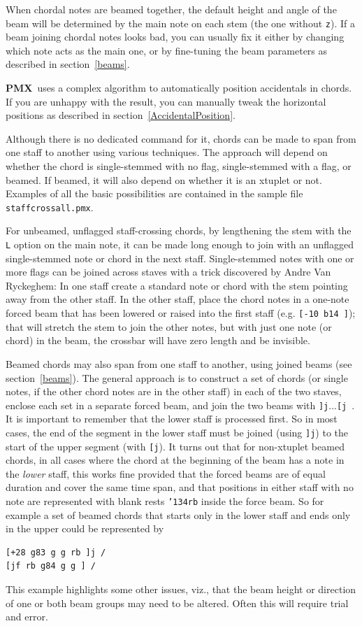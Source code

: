 \documentclass[11pt]{article}
\def\bs{{\tt\char'134}}
\newcommand\PMXX{\textbf{PMX}}
\newcommand\PMX{\PMXX~}
\def\newfrom{2.59}  %
\def\NEW#1{\ifdim#1 pt<\newfrom pt\else%
\marginpar{\fbox{#1}}\fi}
\begin{document}
    When chordal notes are beamed together, the default height and angle of 
the beam will be determined by the main note on each stem (the one without 
{\tt z}).  If a beam joining chordal notes looks bad, you can usually  
fix it either by changing which note acts as the main one, 
or by fine-tuning the beam parameters as described 
in section~\ref{beams}.

\PMX uses a complex algorithm to automatically position accidentals in chords. 
If you are unhappy with the result, you can manually tweak the horizontal 
positions as described in section~\ref{AccidentalPosition}.

Although there is no dedicated command for it, chords can be made to span from
one staff to another using various techniques\NEW{2.73}. The approach will depend on
whether 
the chord is single-stemmed with no flag, single-stemmed with a flag, or beamed. 
If beamed, it will also depend on whether it is an xtuplet or not. Examples of all
the basic possibilities are contained in the sample file {\tt staffcrossall.pmx}.  

For unbeamed, unflagged staff-crossing chords, 
by lengthening the stem with the {\tt L} option on the main note, it can 
be made long enough to join with an unflagged single-stemmed note or chord in the 
next staff. Single-stemmed notes with one or more flags can be joined across staves 
with a trick discovered by Andre Van Ryckeghem: In one staff create a standard note or 
chord with 
the stem pointing away from the other staff. In the other staff, place the chord notes
in a one-note forced beam that has been lowered or raised into the first staff
(e.g. {\tt [-10 b14 ]}); that
will stretch the stem to join the other notes, but with just one note (or chord) in the
beam, the crossbar will have zero length and be invisible. 

Beamed chords may also span from one staff to another, using joined beams (see 
section~\ref{beams}). The general approach is to construct a set of chords 
(or single notes, if the other chord notes are in the other staff) in each of
the two staves, enclose each set in a separate forced beam, and join the two 
beams with {\tt ]j}...{\tt [j}~. It is important to remember that the
lower staff is processed first. So in most cases, the end of the segment in the lower
staff must be joined (using {\tt ]j}) to the start of the upper segment (with {\tt [j}).
It turns out that for non-xtuplet beamed chords, in all cases where the chord at the 
beginning of the beam has a note 
in the {\it lower} staff, this works fine provided that the forced beams are of equal
duration and cover the same time span, and that positions in either staff with no note 
are represented with 
blank rests \bs{\tt rb} inside the force beam. So for example a set of beamed chords 
that starts only in the
lower staff and ends only in the upper could be represented by
\begin{verbatim}
[+28 g83 g g rb ]j /
[jf rb g84 g g ] /
\end{verbatim}
This example highlights some other issues, viz., that the beam height or direction of one 
or both beam groups may need to be altered. Often this will require trial and error. 
\end{document}
